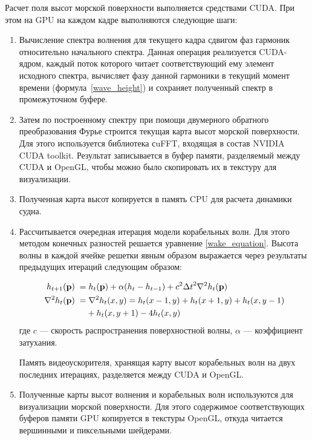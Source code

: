Расчет поля высот морской поверхности выполняется средствами CUDA. При этом на GPU на каждом кадре выполняются следующие шаги:

\begin{enumerate}
\item Вычисление спектра волнения для текущего кадра сдвигом фаз гармоник относительно начального спектра. Данная операция реализуется CUDA-ядром, каждый поток которого читает соответствующий ему элемент исходного спектра, вычисляет фазу данной гармоники в текущий момент времени (формула~\ref{wave_height}) и сохраняет полученный спектр в промежуточном буфере.

\item Затем по построенному спектру при помощи двумерного обратного преобразования Фурье строится текущая карта высот морской поверхности. Для этого используется библиотека сuFFT, входящая в состав NVIDIA CUDA toolkit. Результат записывается в буфер памяти, разделяемый между CUDA и OpenGL, чтобы можно было скопировать их в текстуру для визуализации.

\item Полученная карта высот копируется в память CPU для расчета динамики судна.

\item Рассчитывается очередная итерация модели корабельных волн. Для этого методом конечных разностей решается уравнение \ref{wake_equation}. Высота волны в каждой ячейке решетки явным образом выражается через результаты предыдущих итераций следующим образом: 

\begin{equation}
\begin{split}
h_{t+1}(\mathbf{p}) \; =& \; h_t(\mathbf{p}) + \alpha(h_t - h_{t-1}) +
c^2{\Delta t}^2 \nabla^2 h_t(\mathbf{p}) \\
\nabla^2 h_t(\mathbf{p}) \; =& \; \nabla^2 h_t(x, y) = 
h_t(x-1, y) + h_t(x+1, y) + h_t(x, y-1) \\ &+ h_t(x, y+1) - 4 h_t(x, y)
\end{split}
\end{equation}
где $c$ --- скорость распространения поверхностной волны, $\alpha$ --- коэффициент затухания.

Память видеоускорителя, хранящая карту высот корабельных волн на двух последних итерациях, разделяется между CUDA и OpenGL.

\item Полученные карты высот волнения и корабельных волн используются для визуализации морской поверхности. Для этого содержимое соответствующих буферов памяти GPU копируется в текстуры OpenGL, откуда читается вершинными и пиксельными шейдерами.

\end{enumerate}


